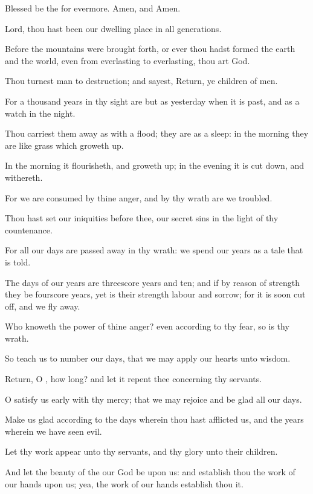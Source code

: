 \Verse Blessed be the \LORD for evermore. Amen, and Amen.




\Chapter
\Verse Lord, thou hast been our dwelling place in all generations.

\Verse Before the mountains were brought forth, or ever thou hadst formed the earth and the world, even from everlasting to everlasting, thou art God.

\Verse Thou turnest man to destruction; and sayest, Return, ye children of men.

\Verse For a thousand years in thy sight are but as yesterday when it is past, and as a watch in the night.

\Verse Thou carriest them away as with a flood; they are as a sleep: in the morning they are like grass which groweth up.

\Verse In the morning it flourisheth, and groweth up; in the evening it is cut down, and withereth.

\Verse For we are consumed by thine anger, and by thy wrath are we troubled.

\Verse Thou hast set our iniquities before thee, our secret sins in the light of thy countenance.

\Verse For all our days are passed away in thy wrath: we spend our years as a tale that is told.

\Verse The days of our years are threescore years and ten; and if by reason of strength they be fourscore years, yet is their strength labour and sorrow; for it is soon cut off, and we fly away.

\Verse Who knoweth the power of thine anger? even according to thy fear, so is thy wrath.

\Verse So teach us to number our days, that we may apply our hearts unto wisdom.

\Verse Return, O \LORD, how long? and let it repent thee concerning thy servants.

\Verse O satisfy us early with thy mercy; that we may rejoice and be glad all our days.

\Verse Make us glad according to the days wherein thou hast afflicted us, and the years wherein we have seen evil.

\Verse Let thy work appear unto thy servants, and thy glory unto their children.

\Verse And let the beauty of the \LORD our God be upon us: and establish thou the work of our hands upon us; yea, the work of our hands establish thou it.




